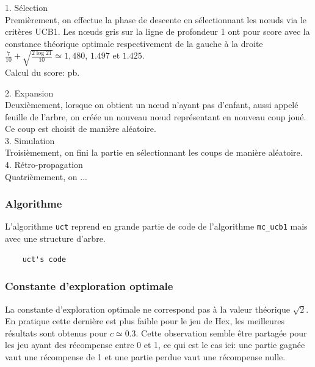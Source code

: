 \documentclass[a4paper]{article}
\theoremstyle{definition}
\begin{document}
1. Sélection\\
Premièrement, on effectue la phase de descente en sélectionnant les nœuds via le critères UCB1. Les nœuds gris sur la ligne de profondeur 1 ont pour score avec la constance théorique optimale respectivement de la gauche à la droite $\frac{7}{10} + \sqrt{\frac{2\log21}{10}} \simeq 1,480$, $1.497$ et $1.425$.
\\
Calcul du score: pb.

\newpage

2. Expansion\\
Deuxièmement, lorsque on obtient un nœud n'ayant pas d'enfant, aussi appelé feuille de l'arbre, on créée un nouveau nœud représentant en nouveau coup joué. Ce coup est choisit de manière aléatoire.\\

3. Simulation\\
Troisièmement, on fini la partie en sélectionnant les coups de manière aléatoire.\\

4. Rétro-propagation\\
Quatrièmement, on ...

\subsubsection{Algorithme}

L'algorithme \texttt{uct} reprend en grande partie de code de l'algorithme \texttt{mc\_ucb1} mais avec une structure d'arbre.

\begin{lstlisting}
	uct's code
\end{lstlisting}

\subsubsection{Constante d'exploration optimale}

La constante d'exploration optimale ne correspond pas à la valeur théorique $\sqrt{2}$. En pratique cette dernière est plus faible pour le jeu de Hex, les meilleures résultats sont obtenus pour $c \simeq 0.3$. Cette observation semble être partagée pour les jeu ayant des récompense entre 0 et 1, ce qui est le cas ici: une partie gagnée vaut une récompense de 1 et une partie perdue vaut une récompense nulle.
\end{document}
